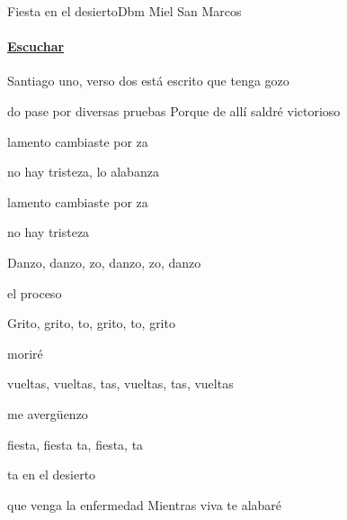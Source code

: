 \documentclass[12pt, spanish]{book}
\begin{document}
    \begin{song}{Fiesta en el desierto}{Dbm}
        {} %
        {Miel San Marcos}
        {} %
        {}
        \ifChordBk
        \paragraph{\mbox{}\hfill\protect\href{https://open.spotify.com/intl-es/track/54vCDB616nrHCvsBrCJyzl}{Escuchar}\mbox{}\hfill}
        \fi


        \begin{SBOpGroup}
             Santiago uno, verso dos
            está escrito que tenga gozo

            do pase por diversas pruebas
            Porque de allí saldré victorioso
        \end{SBOpGroup}

        \begin{SBOpGroup}
             lamento cambiaste por za

             no hay tristeza, lo alabanza

             lamento cambiaste por za

             no hay tristeza
        \end{SBOpGroup}

        \begin{SBChorus}
             Danzo, danzo, zo, danzo, zo, danzo

             el proceso

             Grito, grito, to, grito, to, grito

             moriré

             vueltas, vueltas, tas, vueltas, tas, vueltas

             me avergüenzo

             fiesta, fiesta ta, fiesta, ta

            ta en el desierto
        \end{SBChorus}


        \begin{SBOpGroup}
            que venga la enfermedad
            Mientras viva te alabaré


\end{SBOpGroup}
\end{song}
\end{document}
